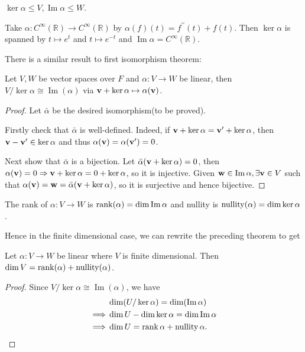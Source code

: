 \documentclass[a4paper]{article}
\begin{document}
\begin{lemma}
    $\ker\alpha\le V,\operatorname{Im}\alpha\le W$.
\end{lemma}
\begin{example}
    Take $\alpha:C^\infty(\mathbb R)\to C^\infty(\mathbb R)$ by $\alpha(f)(t)=f^{\prime\prime}(t)+f(t)$.
    Then $\ker\alpha$ is spanned by $t\mapsto e^t$ and $t\mapsto e^{-t}$ and $\operatorname{Im}\alpha=C^{\infty}(\mathbb R)$.
\end{example}
There is a similar result to first isomorphism theorem:
\begin{theorem}
    Let $V,W$ be vector spaces over $F$ and $\alpha:V\to W$ be linear, then $V/{\ker\alpha}\cong \operatorname{Im}(\alpha)$ via ${\bf v}+\ker\alpha\mapsto \alpha({\bf v})$.
\end{theorem}
\begin{proof}
    Let $ \bar{\alpha} $ be the desired isomorphism(to be proved).

    Firstly check that $ \bar{\alpha} $ is well-defined. Indeed, if $ {\bf v}+\ker \alpha={\bf v}'+\ker \alpha $, then $ {\bf v}-{\bf v}'\in \ker \alpha $ and thus $ \alpha({\bf v})=\alpha({\bf v}')=0 $.

    Next show that $ \bar{\alpha} $ is a bijection. Let $ \bar{\alpha}({\bf v}+\ker \alpha)=0 $, then $ \alpha({\bf v})=0 \Rightarrow {\bf v}+\ker \alpha=0+\ker \alpha $, so it is injective. Given $ {\bf w}\in \Im \alpha, \exists {\bf v}\in V $ such that $ \alpha({\bf v})={\bf w} =\bar{\alpha}({\bf v}+\ker \alpha)$, so it is surjective and hence bijective.
\end{proof}
\begin{definition}
    The rank of $\alpha:V\to W$ is $\rank(\alpha)=\dim\operatorname{Im}\alpha$ and nullity is $\operatorname{nullity}(\alpha)=\dim\ker\alpha$.
\end{definition}
Hence in the finite dimensional case, we can rewrite the preceding theorem to get
\begin{theorem}
    Let $\alpha:V\to W$ be linear where $V$ is finite dimensional.
    Then $\dim V=\rank(\alpha)+\operatorname{nullity}(\alpha)$.
\end{theorem}
\begin{proof}
    Since $ V/{\ker\alpha}\cong \operatorname{Im}(\alpha) $, we have 
    \begin{align*}
        & \dim (U/\ker \alpha)=\dim (\Im \alpha)\\ 
        \implies & \dim U-\dim \ker \alpha=\dim \Im \alpha\\ 
        \implies & \dim U = \rank \alpha+ \operatorname{nullity} \alpha.\qedhere
    \end{align*}
\end{proof}
\end{document}
